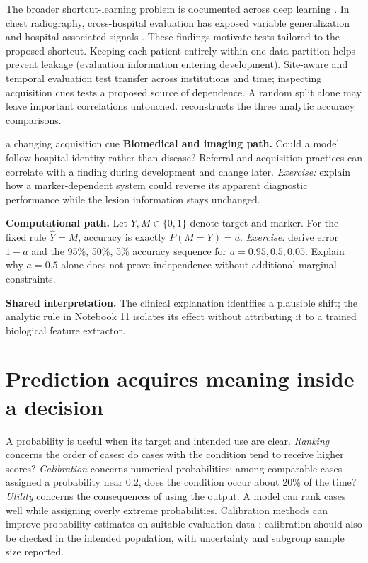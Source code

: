 \documentclass[11pt,a4paper]{article}
\begin{document}
The broader shortcut-learning problem is documented across deep learning \citep{geirhos2020}. In chest radiography, cross-hospital evaluation has exposed variable generalization and hospital-associated signals \citep{zech2018}. These findings motivate tests tailored to the proposed shortcut. Keeping each patient entirely within one data partition helps prevent leakage (evaluation information entering development). Site-aware and temporal evaluation test transfer across institutions and time; inspecting acquisition cues tests a proposed source of dependence. A random split alone may leave important correlations untouched.  reconstructs the three analytic accuracy comparisons.

\begin{perspectives}{a changing acquisition cue}
\textbf{Biomedical and imaging path.} Could a model follow hospital identity rather than disease? Referral and acquisition practices can correlate with a finding during development and change later. \emph{Exercise:} explain how a marker-dependent system could reverse its apparent diagnostic performance while the lesion information stays unchanged.

\textbf{Computational path.} Let $Y,M\in\{0,1\}$ denote target and marker. For the fixed rule $\hat Y=M$, accuracy is exactly $P(M=Y)=a$. \emph{Exercise:} derive error $1-a$ and the 95\%, 50\%, 5\% accuracy sequence for $a=0.95,0.5,0.05$. Explain why $a=0.5$ alone does not prove independence without additional marginal constraints.

\textbf{Shared interpretation.} The clinical explanation identifies a plausible shift; the analytic rule in Notebook 11 isolates its effect without attributing it to a trained biological feature extractor.
\end{perspectives}


\section{Prediction acquires meaning inside a decision}\label{sec:decisions}
A probability is useful when its target and intended use are clear. \emph{Ranking} concerns the order of cases: do cases with the condition tend to receive higher scores? \emph{Calibration} concerns numerical probabilities: among comparable cases assigned a probability near 0.2, does the condition occur about 20\% of the time? \emph{Utility} concerns the consequences of using the output. A model can rank cases well while assigning overly extreme probabilities. Calibration methods can improve probability estimates on suitable evaluation data \citep{guo2017}; calibration should also be checked in the intended population, with uncertainty and subgroup sample size reported.
\end{document}

